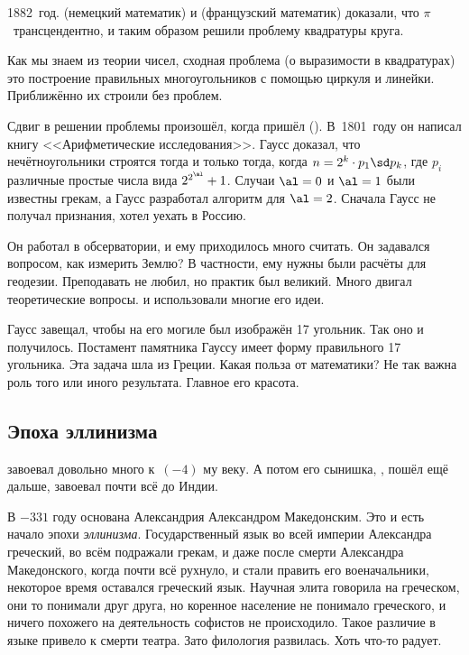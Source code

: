 \documentclass[a4paper,oneside,fleqn,10pt]{article}
\begin{document}
1882~год.  (немецкий математик) и
 (французский математик) доказали, что
$\pi$~трансцендентно, и таким образом решили проблему квадратуры
круга.

Как мы знаем из теории чисел, сходная проблема (о выразимости в
квадратурах) это построение правильных многоугольников с помощью
циркуля и линейки.  Приближённо их строили без проблем.

Сдвиг в решении проблемы произошёл, когда пришёл  ().  В~1801~году он написал книгу
<<Арифметические исследования>>.  Гаусс доказал, что нечётноугольники
строятся тогда и только тогда, когда $n = 2^k \cdot p_1 \sd p_k$, где
$p_i$ различные простые числа вида $2^{2^\al} +1$.  Случаи $\al = 0$ и
$\al = 1$ были известны грекам, а Гаусс разработал алгоритм для $\al =
2$.  Сначала Гаусс не получал признания, хотел уехать в Россию.

Он работал в обсерватории, и ему приходилось много считать. Он
задавался вопросом, как измерить Землю?  В частности, ему нужны были
расчёты для геодезии. Преподавать не любил, но практик был великий.
Много двигал теоретические вопросы.  и 
использовали многие его идеи.

Гаусс завещал, чтобы на его могиле был изображён 17 угольник.  Так оно
и получилось. Постамент памятника Гауссу  имеет форму правильного 17
угольника.  Эта задача шла из Греции. Какая польза от математики?  Не
так важна роль того или иного результата. Главное его красота.


\subsection{Эпоха эллинизма}

 завоевал довольно много к~$(-4)$ му веку. А
потом его сынишка, , пошёл ещё дальше,
завоевал почти всё до Индии.

В $-331$ году основана Александрия Александром Македонским.  Это и
есть начало эпохи \emph{эллинизма}. Государственный язык во всей
империи Александра греческий, во всём подражали грекам, и даже после
смерти Александра Македонского, когда почти всё рухнуло, и стали
править его военачальники, некоторое время оставался греческий язык.
Научная элита говорила на греческом, они то понимали друг друга, но
коренное население не понимало греческого, и ничего похожего на
деятельность софистов не происходило. Такое различие в языке привело к
смерти театра.  Зато филология развилась. Хоть что-то радует.
\end{document}
